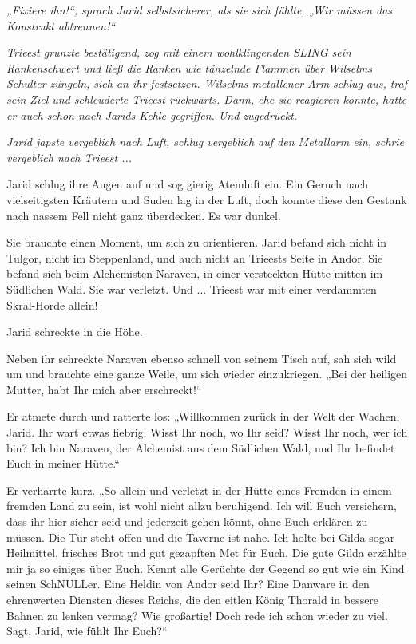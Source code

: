 \textit{„Fixiere ihn!“, sprach Jarid selbstsicherer, als sie sich fühlte, „Wir müssen das Konstrukt abtrennen!“}

\textit{Trieest grunzte bestätigend, zog mit einem wohlklingenden SLING sein Rankenschwert und ließ die Ranken wie tänzelnde Flammen über Wilselms Schulter züngeln, sich an ihr festsetzen. Wilselms metallener Arm schlug aus, traf sein Ziel und schleuderte Trieest rückwärts. Dann, ehe sie reagieren konnte, hatte er auch schon nach Jarids Kehle gegriffen. Und zugedrückt.}

\textit{Jarid japste vergeblich nach Luft, schlug vergeblich auf den Metallarm ein, schrie vergeblich nach Trieest ...}\bigskip






Jarid schlug ihre Augen auf und sog gierig Atemluft ein. Ein Geruch nach vielseitigsten Kräutern und Suden lag in der Luft, doch konnte diese den Gestank nach nassem Fell nicht ganz überdecken. Es war dunkel.

Sie brauchte einen Moment, um sich zu orientieren. Jarid befand sich nicht in Tulgor, nicht im Steppenland, und auch nicht an Trieests Seite in Andor. Sie befand sich beim Alchemisten Naraven, in einer versteckten Hütte mitten im Südlichen Wald. Sie war verletzt. Und ... Trieest war mit einer verdammten Skral-Horde allein!

Jarid schreckte in die Höhe.

Neben ihr schreckte Naraven ebenso schnell von seinem Tisch auf, sah sich wild um und brauchte eine ganze Weile, um sich wieder einzukriegen. „Bei der heiligen Mutter, habt Ihr mich aber erschreckt!“

Er atmete durch und ratterte los: „Willkommen zurück in der Welt der Wachen, Jarid. Ihr wart etwas fiebrig. Wisst Ihr noch, wo Ihr seid? Wisst Ihr noch, wer ich bin? Ich bin Naraven, der Alchemist aus dem Südlichen Wald, und Ihr befindet Euch in meiner Hütte.“

Er verharrte kurz. „So allein und verletzt in der Hütte eines Fremden in einem fremden Land zu sein, ist wohl nicht allzu beruhigend. Ich will Euch versichern, dass ihr hier sicher seid und jederzeit gehen könnt, ohne Euch erklären zu müssen. Die Tür steht offen und die Taverne ist nahe. Ich holte bei Gilda sogar Heilmittel, frisches Brot und gut gezapften Met für Euch. Die gute Gilda erzählte mir ja so einiges über Euch. Kennt alle Gerüchte der Gegend so gut wie ein Kind seinen SchNULLer. Eine Heldin von Andor seid Ihr? Eine Danware in den ehrenwerten Diensten dieses Reichs, die den eitlen König Thorald in bessere Bahnen zu lenken vermag? Wie großartig! Doch rede ich schon wieder zu viel. Sagt, Jarid, wie fühlt Ihr Euch?“

